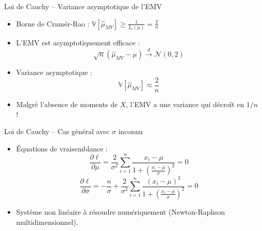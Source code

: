 \documentclass[11pt,aspectratio=169]{beamer}
\begin{document}
\begin{frame}{Loi de Cauchy -- Variance asymptotique de l'EMV}

\begin{itemize}

\item Borne de Cramér-Rao : $\mathbb{V}[\hat{\mu}_{MV}] \geq \frac{1}{I_n(\mu)} = \frac{2}{n}$\newline

\item L'EMV est asymptotiquement efficace :
  \[
  \sqrt{n}(\hat{\mu}_{MV} - \mu) \xrightarrow{d} \mathcal{N}(0, 2)
  \]

\item Variance asymptotique :
  \[
  \boxed{\mathbb{V}[\hat{\mu}_{MV}] \approx \frac{2}{n}}
  \]

\item Malgré l'absence de moments de $X$, l'EMV a une variance qui décroît en $1/n$ !

\end{itemize}

\end{frame}

\begin{frame}{Loi de Cauchy -- Cas général avec $\sigma$ inconnu}

\begin{itemize}

\item Équations de vraisemblance :
  \[
  \frac{\partial \ell}{\partial \mu} = \frac{2}{\sigma^2}\sum_{i=1}^n \frac{x_i - \mu}{1 + \left(\frac{x_i - \mu}{\sigma}\right)^2} = 0
  \]
  \[
  \frac{\partial \ell}{\partial \sigma} = -\frac{n}{\sigma} + \frac{2}{\sigma^3}\sum_{i=1}^n \frac{(x_i - \mu)^2}{1 + \left(\frac{x_i - \mu}{\sigma}\right)^2} = 0
  \]

\item Système non linéaire à résoudre numériquement (Newton-Raphson multidimensionnel).

\end{itemize}

\end{frame}
\end{document}

